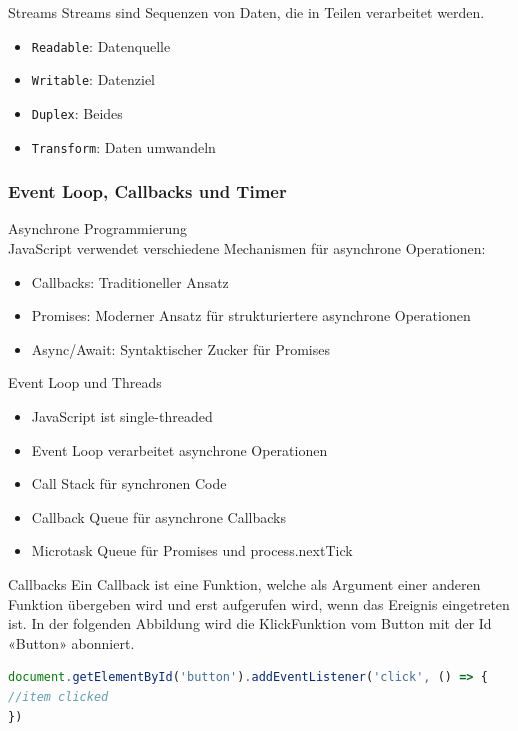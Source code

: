 \begin{definition}{Streams}
    Streams sind Sequenzen von Daten, die in Teilen verarbeitet werden.
    \begin{itemize}
        \item \texttt{Readable}: Datenquelle
        \item \texttt{Writable}: Datenziel
        \item \texttt{Duplex}: Beides
        \item \texttt{Transform}: Daten umwandeln
    \end{itemize}
\end{definition}

\subsubsection{Event Loop, Callbacks und Timer}

\begin{concept}{Asynchrone Programmierung}\\
    JavaScript verwendet verschiedene Mechanismen für asynchrone Operationen:
    \begin{itemize}
        \item Callbacks: Traditioneller Ansatz
        \item Promises: Moderner Ansatz für strukturiertere asynchrone Operationen
        \item Async/Await: Syntaktischer Zucker für Promises
    \end{itemize}
\end{concept}

\begin{concept}{Event Loop und Threads}
    \begin{itemize}
        \item JavaScript ist single-threaded
        \item Event Loop verarbeitet asynchrone Operationen
        \item Call Stack für synchronen Code
        \item Callback Queue für asynchrone Callbacks
        \item Microtask Queue für Promises und process.nextTick
    \end{itemize}
\end{concept}

\begin{definition}{Callbacks}
Ein Callback ist eine Funktion, welche als Argument einer anderen Funktion übergeben wird und erst aufgerufen wird, wenn das Ereignis eingetreten ist. 
In der folgenden Abbildung wird die KlickFunktion vom Button mit der Id «Button» abonniert.
\begin{lstlisting}[language=JavaScript, style=basesmol]
document.getElementById('button').addEventListener('click', () => {
//item clicked
})
\end{lstlisting}
\end{definition}

